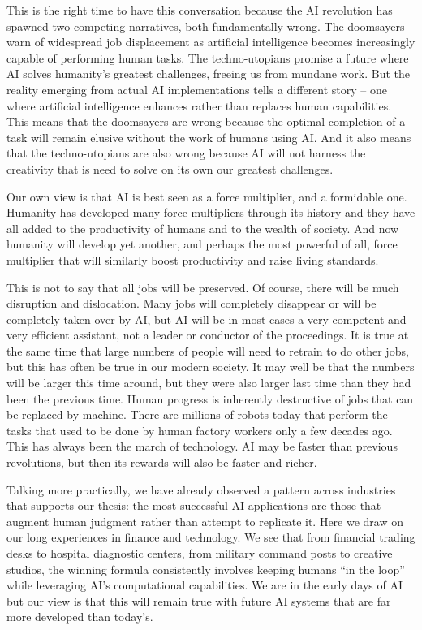 \documentclass[
  Letterpaper,
]{scrbook}
\begin{document}
This is the right time to have this conversation because the AI
revolution has spawned two competing narratives, both fundamentally
wrong. The doomsayers warn of widespread job displacement as artificial
intelligence becomes increasingly capable of performing human tasks. The
techno-utopians promise a future where AI solves humanity's greatest
challenges, freeing us from mundane work. But the reality emerging from
actual AI implementations tells a different story -- one where
artificial intelligence enhances rather than replaces human
capabilities. This means that the doomsayers are wrong because the
optimal completion of a task will remain elusive without the work of
humans using AI. And it also means that the techno-utopians are also
wrong because AI will not harness the creativity that is need to solve
on its own our greatest challenges.

Our own view is that AI is best seen as a force multiplier, and a
formidable one. Humanity has developed many force multipliers through
its history and they have all added to the productivity of humans and to
the wealth of society. And now humanity will develop yet another, and
perhaps the most powerful of all, force multiplier that will similarly
boost productivity and raise living standards.

This is not to say that all jobs will be preserved. Of course, there
will be much disruption and dislocation. Many jobs will completely
disappear or will be completely taken over by AI, but AI will be in most
cases a very competent and very efficient assistant, not a leader or
conductor of the proceedings. It is true at the same time that large
numbers of people will need to retrain to do other jobs, but this has
often be true in our modern society. It may well be that the numbers
will be larger this time around, but they were also larger last time
than they had been the previous time. Human progress is inherently
destructive of jobs that can be replaced by machine. There are millions
of robots today that perform the tasks that used to be done by human
factory workers only a few decades ago. This has always been the march
of technology. AI may be faster than previous revolutions, but then its
rewards will also be faster and richer.

Talking more practically, we have already observed a pattern across
industries that supports our thesis: the most successful AI applications
are those that augment human judgment rather than attempt to replicate
it. Here we draw on our long experiences in finance and technology. We
see that from financial trading desks to hospital diagnostic centers,
from military command posts to creative studios, the winning formula
consistently involves keeping humans ``in the loop'' while leveraging
AI's computational capabilities. We are in the early days of AI but our
view is that this will remain true with future AI systems that are far
more developed than today's.
\end{document}
